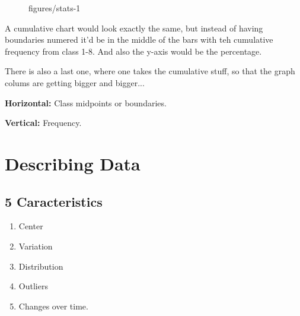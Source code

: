 \begin{figure}[ht]
    \centering
    \caption{figures/stats-1}
    \label{fig:stats-1}
\end{figure}

A cumulative chart would look exactly the same, but instead of having
boundaries numered it'd be in the middle of the bars with teh cumulative
frequency from class 1-8. And also the y-axis would be the percentage.

There is also a last one, where one takes the cumulative stuff, so that the
graph colums are getting bigger and bigger...

\textbf{Horizontal:} Class midpoints or boundaries.

\textbf{Vertical:} Frequency.



\chapter{Describing Data}

\section{5 Caracteristics} \begin{enumerate}
    \item Center
    \item Variation
    \item Distribution
    \item Outliers 
    \item Changes over time.
\end{enumerate}

